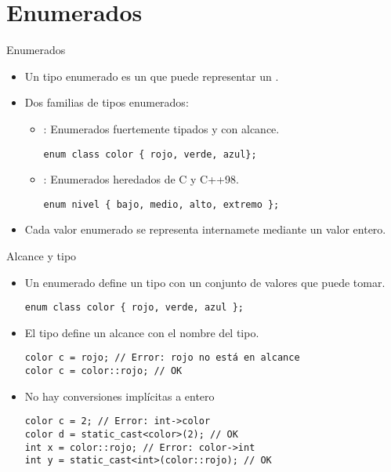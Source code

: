 \section{Enumerados}

\begin{frame}[t,fragile]{Enumerados}
\begin{itemize}
  \item Un tipo enumerado es un  que puede
        representar un .

  \item Dos familias de tipos enumerados:
    \begin{itemize}
      \item {}: Enumerados fuertemente tipados y con alcance.
\begin{lstlisting}
enum class color { rojo, verde, azul};
\end{lstlisting}
      \item {}: Enumerados heredados de C y C++98.
\begin{lstlisting}
enum nivel { bajo, medio, alto, extremo };
\end{lstlisting}
    \end{itemize}

  \item Cada valor enumerado se representa internamete mediante un valor entero.
\end{itemize}
\end{frame}

\begin{frame}[t,fragile]{Alcance y tipo}
\begin{itemize}
  \item Un enumerado define un tipo con un conjunto de valores que puede tomar.
\begin{lstlisting}
enum class color { rojo, verde, azul };
\end{lstlisting}

  \item El tipo define un alcance con el nombre del tipo.
\begin{lstlisting}
color c = rojo; // Error: rojo no está en alcance
color c = color::rojo; // OK
\end{lstlisting}

  \item No hay conversiones implícitas a entero
\begin{lstlisting}
color c = 2; // Error: int->color
color d = static_cast<color>(2); // OK
int x = color::rojo; // Error: color->int
int y = static_cast<int>(color::rojo); // OK
\end{lstlisting}
\end{itemize}

\end{frame}


